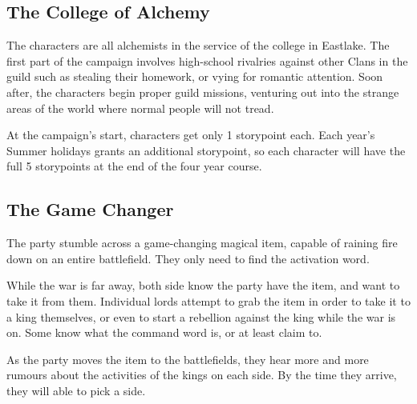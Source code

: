 {\begin{multicols}{2}
\subsection{The College of Alchemy}

The characters are all alchemists in the service of the \gls{college} in Eastlake.
The first part of the campaign involves high-school rivalries against other Clans in the guild such as stealing their homework, or vying for romantic attention.
Soon after, the characters begin proper guild missions, venturing out into the strange areas of the world where normal people will not tread.

At the campaign's start, characters get only 1 \gls{storypoint} each.
Each year's Summer holidays grants an additional \gls{storypoint}, so each character will have the full 5 \glspl{storypoint} at the end of the four year course.

\subsection{The Game Changer}

The party stumble across a game-changing magical item, capable of raining fire down on an entire battlefield.
They only need to find the activation word.

While the war is far away, both side know the party have the item, and want to take it from them.
Individual lords attempt to grab the item in order to take it to a king themselves, or even to start a rebellion against the king while the war is on.
Some know what the command word is, or at least claim to.

As the party moves the item to the battlefields, they hear more and more rumours about the activities of the kings on each side.
By the time they arrive, they will able to pick a side.

\end{multicols}

}{}
